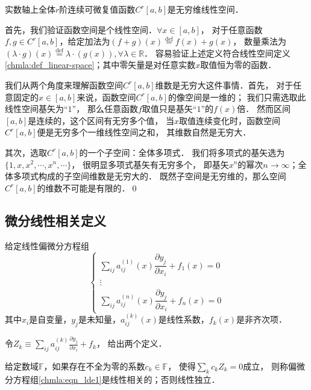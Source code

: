 
\begin{example}\label{chmla:exm-cab}
    实数轴上全体$r$阶连续可微复值函数$C^r[a,b]$是无穷维线性空间．
\end{example}
首先，我们验证函数空间是个线性空间．$\forall x\in [a,b]$，
对于任意函数$f,g\in C^r[a,b]$，给定加法为$(f+g)(x)\overset{\mathrm {def}}{=}f(x)+g(x)$，
数量乘法为$(\lambda \cdot g) (x)\overset{\mathrm {def}}{=}\lambda \cdot (g (x)), \forall \lambda \in \mathbb{R}$．
容易验证上述定义符合线性空间定义\ref{chmla:def_linear-space}；其中零矢量是对任意实数$x$取值恒为零的函数．

我们从两个角度来理解函数空间$C^r[a,b]$维数是无穷大这件事情．首先，
对于任意固定的$x\in [a,b]$来说，函数空间$C^r[a,b]$的像空间是一维的；
我们只需选取此线性空间基矢为“$1$”，
那么任意函数$f$取值只是基矢“$1$”的$f(x)$倍．
然而区间$[a,b]$是连续的，这个区间有无穷多个值，
当$x$取值连续变化时，函数空间$C^r[a,b]$便是无穷多个一维线性空间之和，
其维数自然是无穷大．

其次，选取$C^r[a,b]$的一个子空间：全体多项式．
我们将多项式的基矢选为$\{1, x, x^2, \cdots, x^n,\cdots \}$，
很明显多项式基矢有无穷多个，
即基矢$x^n$的幂次$n\to \infty$；全体多项式构成的子空间维数是无穷大的．
既然子空间是无穷维的，那么空间$C^r[a,b]$的维数不可能是有限的．\qed




\subsection{微分线性相关定义}\label{chmla:sec_diff-linear-dependence}
给定线性偏微分方程组
\begin{equation}\label{chmla:eqn_lde1}
    \left\{ {\begin{array}{*{20}{c}}
            \sum\limits_{ij} {a_{ij}^{( 1 )}(x)\dfrac{{\partial {y_j}}}{{\partial {x_i}}}}  + {f_1}(x) = 0  \\
            \vdots \\
            \sum\limits_{ij} {a_{ij}^{( n )}(x)\dfrac{{\partial {y_j}}}{{\partial {x_i}}}}  + {f_n}(x) = 0
    \end{array}} \right.
\end{equation}
其中$x_i$是自变量，$y_j$是未知量，$a_{ij}^{( k )}(x)$是线性系数，$f_k(x)$是非齐次项．

令${Z_k} \equiv\sum_{ij}{a_{ij}^{( k )}\frac{{\partial {y_j}}}{{\partial {x_i}}}}  + {f_k}$，
给出两个定义．
\begin{definition}\label{chmla:def_linear-dependence}
    给定数域$\mathbb{F}$，如果存在不全为零的系数$c_k\in \mathbb{F}$，
    使得$\sum_{k} {{c_k}{Z_k} = 0} $成立，
    则称偏微分方程组\eqref{chmla:eqn_lde1}是线性相关的；否则线性独立．
\end{definition}

